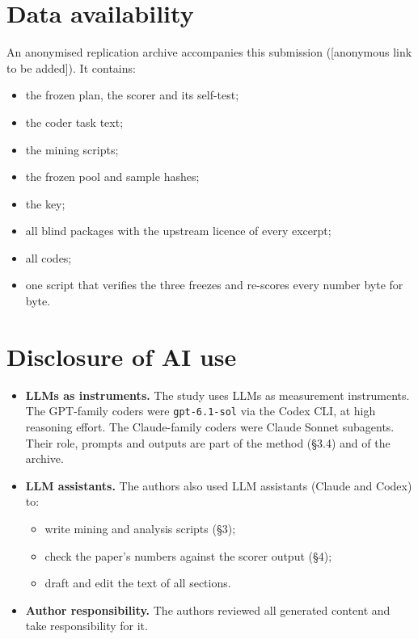 \documentclass[conference]{IEEEtran}
\begin{document}
\section*{Data availability}
An anonymised replication archive accompanies this submission ([anonymous link to be added]). It contains:
\begin{itemize}
\item the frozen plan, the scorer and its self-test;
\item the coder task text;
\item the mining scripts;
\item the frozen pool and sample hashes;
\item the key;
\item all blind packages with the upstream licence of every excerpt;
\item all codes;
\item one script that verifies the three freezes and re-scores every number byte for byte.
\end{itemize}

\section*{Disclosure of AI use}
\begin{itemize}
\item \textbf{LLMs as instruments.} The study uses LLMs as measurement instruments. The GPT-family coders were \texttt{gpt-6.1-sol} via the Codex CLI, at high reasoning effort. The Claude-family coders were Claude Sonnet subagents. Their role, prompts and outputs are part of the method (\S{}3.4) and of the archive.
\item \textbf{LLM assistants.} The authors also used LLM assistants (Claude and Codex) to:
\begin{itemize}
\item write mining and analysis scripts (\S{}3);
\item check the paper's numbers against the scorer output (\S{}4);
\item draft and edit the text of all sections.
\end{itemize}
\item \textbf{Author responsibility.} The authors reviewed all generated content and take responsibility for it.
\end{itemize}



\end{document}
